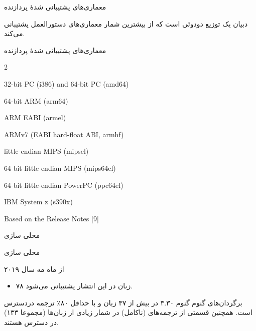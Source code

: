 \documentclass[hyperref={colorlinks}]{beamer}
\begin{document}
\begin{persian}
\begin{frame}{معماری‌های پشتیبانی شدهٔ پردازنده}
\footnotesize{
دبیان یک توزیع دودوئی است که از بیشترین شمار معماری‌های دستورالعمل پشتیبانی می‌کند.

\begin{block}{معماری‌های پشتیبانی شدهٔ پردازنده}
	\begin{itemize}
		\begin{latin}
		\end{latin}
	\end{itemize}
\end{block}
\textsf{Based on the Release Notes [9]}
}
\end{frame}
\end{persian}


\begin{persian}
\begin{frame}{محلی سازی}
\begin{block}{محلی سازی}

\textsf{از ماه مه سال ۲۰۱۹}
\begin{itemize}
\item 
۷۸ زبان در این انتشار پشتیبانی می‌شود.

\end{itemize}

\end{block}
\begin{block}{برگردان‌های گنوم}
گنوم ۳.۳۰ در بیش از ۳۷ زبان و با حداقل ۸۰٪ ترجمه دردسترس است.
همچنین قسمتی از ترجمه‌‌های (ناکامل) در شمار زیادی از زبان‌ها (مجموعا ۱۳۳) در دسترس هستند.

\end{block}

\end{frame}

\end{persian}
\end{document}
